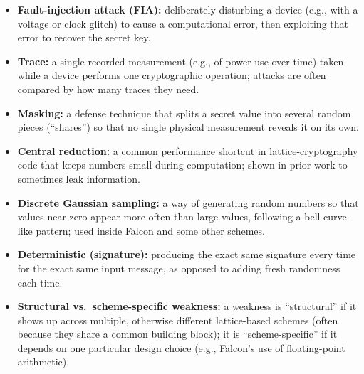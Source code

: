 \documentclass[11pt,a4paper]{article}
\begin{document}
\begin{itemize}[leftmargin=*]
  \item \textbf{Fault-injection attack (FIA):} deliberately disturbing a device (e.g., with a voltage or clock glitch) to cause a computational error, then exploiting that error to recover the secret key.
  \item \textbf{Trace:} a single recorded measurement (e.g., of power use over time) taken while a device performs one cryptographic operation; attacks are often compared by how many traces they need.
  \item \textbf{Masking:} a defense technique that splits a secret value into several random pieces (``shares'') so that no single physical measurement reveals it on its own.
  \item \textbf{Central reduction:} a common performance shortcut in lattice-cryptography code that keeps numbers small during computation; shown in prior work to sometimes leak information.
  \item \textbf{Discrete Gaussian sampling:} a way of generating random numbers so that values near zero appear more often than large values, following a bell-curve-like pattern; used inside Falcon and some other schemes.
  \item \textbf{Deterministic (signature):} producing the exact same signature every time for the exact same input message, as opposed to adding fresh randomness each time.
  \item \textbf{Structural vs.\ scheme-specific weakness:} a weakness is ``structural'' if it shows up across multiple, otherwise different lattice-based schemes (often because they share a common building block); it is ``scheme-specific'' if it depends on one particular design choice (e.g., Falcon's use of floating-point arithmetic).
\end{itemize}
\end{document}
